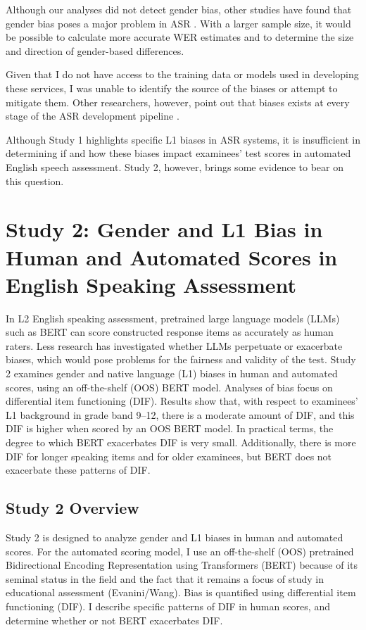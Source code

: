 \documentclass [PhD] {uclathes}
\begin{document}
Although our analyses did not detect gender bias, other studies have found that gender bias poses a major problem in ASR \citep{hutiri2022}. With a larger sample size, it would be possible to calculate more accurate WER estimates and to determine the size and direction of gender-based differences. 

Given that I do not have access to the training data or models used in developing these services, I was unable to identify the source of the biases or attempt to mitigate them. Other researchers, however, point out that biases exists at every stage of the ASR development pipeline \citep{hutiri2022, suresh2021framework}.

Although Study 1 highlights specific L1 biases in ASR systems, it is insufficient in determining if and how these biases impact examinees' test scores in automated English speech assessment. Study 2, however, brings some evidence to bear on this question. 



\chapter{Study 2: Gender and L1 Bias in Human and Automated Scores in English Speaking Assessment}

In L2 English speaking assessment, pretrained large language models (LLMs) such as BERT can score constructed response items as accurately as human raters. Less research has investigated whether LLMs perpetuate or exacerbate biases, which would pose problems for the fairness and validity of the test. Study 2 examines gender and native language (L1) biases in human and automated scores, using an off-the-shelf (OOS) BERT model. Analyses of bias focus on differential item functioning (DIF). Results show that, with respect to examinees’ L1 background in grade band 9–12, there is a moderate amount of DIF, and this DIF is higher when scored by an OOS BERT model. In practical terms, the degree to which BERT exacerbates DIF is very small. Additionally, there is more DIF for longer speaking items and for older examinees, but BERT does not exacerbate these patterns of DIF. 

\section{Study 2 Overview} 

Study 2 is designed to analyze gender and L1 biases in human and automated scores. For the automated scoring model, I use an off-the-shelf (OOS) pretrained Bidirectional Encoding Representation using Transformers (BERT) because of its seminal status in the field \citep{devlin2018} and the fact that it remains a focus of study in educational assessment (Evanini/Wang). Bias is quantified using differential item functioning (DIF). I describe specific patterns of DIF in human scores, and determine whether or not BERT exacerbates DIF. 
\end{document}
